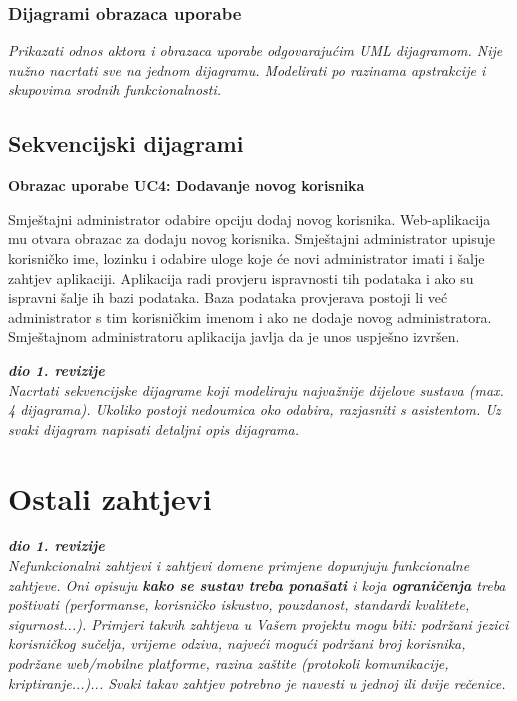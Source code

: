 					
				\subsubsection{Dijagrami obrazaca uporabe}
					
					\textit{Prikazati odnos aktora i obrazaca uporabe odgovarajućim UML dijagramom. Nije nužno nacrtati sve na jednom dijagramu. Modelirati po razinama apstrakcije i skupovima srodnih funkcionalnosti.}
				\eject		
				
			\subsection{Sekvencijski dijagrami}
			\textbf{Obrazac uporabe UC4: Dodavanje novog korisnika}
			
			Smještajni administrator odabire opciju dodaj novog korisnika. Web-aplikacija mu otvara obrazac za dodaju novog korisnika. Smještajni administrator upisuje korisničko ime, lozinku i odabire uloge koje će novi administrator imati i šalje zahtjev aplikaciji. Aplikacija radi provjeru ispravnosti tih podataka i ako su ispravni šalje ih bazi podataka. Baza podataka provjerava postoji li već administrator s tim korisničkim imenom i ako ne dodaje novog administratora. Smještajnom administratoru aplikacija javlja da je unos uspješno izvršen.
			
				
				\textbf{\textit{dio 1. revizije}}\\
				
				\textit{Nacrtati sekvencijske dijagrame koji modeliraju najvažnije dijelove sustava (max. 4 dijagrama). Ukoliko postoji nedoumica oko odabira, razjasniti s asistentom. Uz svaki dijagram napisati detaljni opis dijagrama.}
				\eject
	
		\section{Ostali zahtjevi}
		
			\textbf{\textit{dio 1. revizije}}\\
		 
			 \textit{Nefunkcionalni zahtjevi i zahtjevi domene primjene dopunjuju funkcionalne zahtjeve. Oni opisuju \textbf{kako se sustav treba ponašati} i koja \textbf{ograničenja} treba poštivati (performanse, korisničko iskustvo, pouzdanost, standardi kvalitete, sigurnost...). Primjeri takvih zahtjeva u Vašem projektu mogu biti: podržani jezici korisničkog sučelja, vrijeme odziva, najveći mogući podržani broj korisnika, podržane web/mobilne platforme, razina zaštite (protokoli komunikacije, kriptiranje...)... Svaki takav zahtjev potrebno je navesti u jednoj ili dvije rečenice.}
			 
			 
			 
	